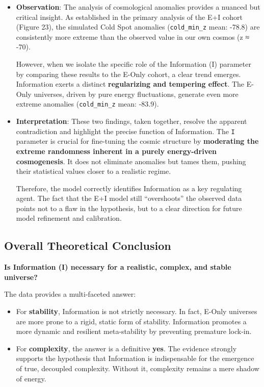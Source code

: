\begin{itemize}
\item
  \textbf{Observation}: The analysis of cosmological anomalies provides
  a nuanced but critical insight. As established in the primary analysis
  of the E+I cohort (Figure 23), the simulated Cold Spot anomalies
  (\texttt{cold\_min\_z} mean: -78.8) are consistently more extreme than
  the observed value in our own cosmos (z ≈ -70).

  However, when we isolate the specific role of the Information (I)
  parameter by comparing these results to the E-Only cohort, a clear
  trend emerges. Information exerts a distinct \textbf{regularizing and
  tempering effect}. The E-Only universes, driven by pure energy
  fluctuations, generate even more extreme anomalies
  (\texttt{cold\_min\_z} mean: -83.9).
\item
  \textbf{Interpretation}: These two findings, taken together, resolve
  the apparent contradiction and highlight the precise function of
  Information. The \texttt{I} parameter is crucial for fine-tuning the
  cosmic structure by \textbf{moderating the extreme randomness inherent
  in a purely energy-driven cosmogenesis}. It does not eliminate
  anomalies but tames them, pushing their statistical values closer to a
  realistic regime.

  Therefore, the model correctly identifies Information as a key
  regulating agent. The fact that the E+I model still ``overshoots'' the
  observed data points not to a flaw in the hypothesis, but to a clear
  direction for future model refinement and calibration.
\end{itemize}

\subsection{Overall Theoretical
Conclusion}\label{overall-theoretical-conclusion}

\textbf{Is Information (I) necessary for a realistic, complex, and
stable universe?}

The data provides a multi-faceted answer:

\begin{itemize}
\item
  For \textbf{stability}, Information is not strictly necessary. In
  fact, E-Only universes are more prone to a rigid, static form of
  stability. Information promotes a more dynamic and resilient
  meta-stability by preventing premature lock-in.
\item
  For \textbf{complexity}, the answer is a definitive \textbf{yes}. The
  evidence strongly supports the hypothesis that Information is
  indispensable for the emergence of true, decoupled complexity. Without
  it, complexity remains a mere shadow of energy.
\end{itemize}


